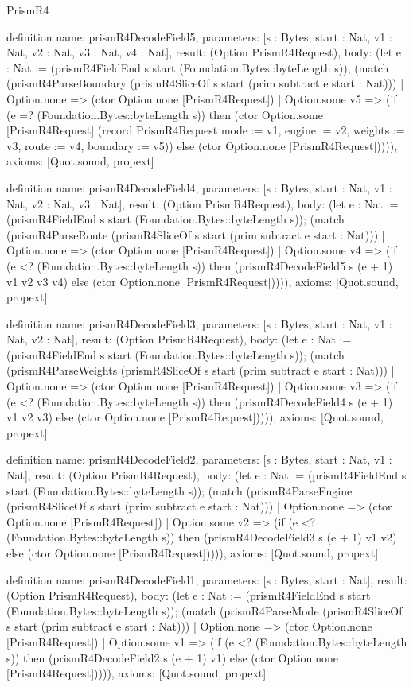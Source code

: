 \begin{lexlean}{PrismR4}
\begin{semanticmodule}
definition{
  name: prismR4DecodeField5,
  parameters: [s : Bytes, start : Nat, v1 : Nat, v2 : Nat, v3 : Nat, v4 : Nat],
  result: (Option PrismR4Request),
  body: (let e : Nat := (prismR4FieldEnd s start (Foundation.Bytes::byteLength s)); (match (prismR4ParseBoundary (prismR4SliceOf s start (prim subtract e start : Nat)))
    | Option.none => (ctor Option.none [PrismR4Request])
    | Option.some v5 => (if (e =? (Foundation.Bytes::byteLength s)) then (ctor Option.some [PrismR4Request] (record PrismR4Request {mode := v1, engine := v2, weights := v3, route := v4, boundary := v5})) else (ctor Option.none [PrismR4Request])))),
  axioms: [Quot.sound, propext]
}

definition{
  name: prismR4DecodeField4,
  parameters: [s : Bytes, start : Nat, v1 : Nat, v2 : Nat, v3 : Nat],
  result: (Option PrismR4Request),
  body: (let e : Nat := (prismR4FieldEnd s start (Foundation.Bytes::byteLength s)); (match (prismR4ParseRoute (prismR4SliceOf s start (prim subtract e start : Nat)))
    | Option.none => (ctor Option.none [PrismR4Request])
    | Option.some v4 => (if (e <? (Foundation.Bytes::byteLength s)) then (prismR4DecodeField5 s (e + 1) v1 v2 v3 v4) else (ctor Option.none [PrismR4Request])))),
  axioms: [Quot.sound, propext]
}

definition{
  name: prismR4DecodeField3,
  parameters: [s : Bytes, start : Nat, v1 : Nat, v2 : Nat],
  result: (Option PrismR4Request),
  body: (let e : Nat := (prismR4FieldEnd s start (Foundation.Bytes::byteLength s)); (match (prismR4ParseWeights (prismR4SliceOf s start (prim subtract e start : Nat)))
    | Option.none => (ctor Option.none [PrismR4Request])
    | Option.some v3 => (if (e <? (Foundation.Bytes::byteLength s)) then (prismR4DecodeField4 s (e + 1) v1 v2 v3) else (ctor Option.none [PrismR4Request])))),
  axioms: [Quot.sound, propext]
}

definition{
  name: prismR4DecodeField2,
  parameters: [s : Bytes, start : Nat, v1 : Nat],
  result: (Option PrismR4Request),
  body: (let e : Nat := (prismR4FieldEnd s start (Foundation.Bytes::byteLength s)); (match (prismR4ParseEngine (prismR4SliceOf s start (prim subtract e start : Nat)))
    | Option.none => (ctor Option.none [PrismR4Request])
    | Option.some v2 => (if (e <? (Foundation.Bytes::byteLength s)) then (prismR4DecodeField3 s (e + 1) v1 v2) else (ctor Option.none [PrismR4Request])))),
  axioms: [Quot.sound, propext]
}

definition{
  name: prismR4DecodeField1,
  parameters: [s : Bytes, start : Nat],
  result: (Option PrismR4Request),
  body: (let e : Nat := (prismR4FieldEnd s start (Foundation.Bytes::byteLength s)); (match (prismR4ParseMode (prismR4SliceOf s start (prim subtract e start : Nat)))
    | Option.none => (ctor Option.none [PrismR4Request])
    | Option.some v1 => (if (e <? (Foundation.Bytes::byteLength s)) then (prismR4DecodeField2 s (e + 1) v1) else (ctor Option.none [PrismR4Request])))),
  axioms: [Quot.sound, propext]
}


\end{semanticmodule}
\end{lexlean}
